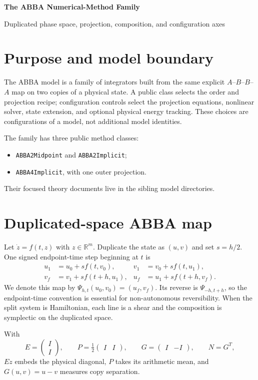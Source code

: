 \documentclass[11pt,a4paper]{article}
\newcommand{\R}{\mathbb{R}}
\begin{document}
\begin{center}
 {\LARGE\bfseries\color{gcblue}The ABBA Numerical-Method Family}\par
 \vspace{0.35em}
 {\large Duplicated phase space, projection, composition, and configuration axes}
\end{center}

\section{Purpose and model boundary}

The ABBA model is a family of integrators built from the same explicit
$A$--$B$--$B$--$A$ map on two copies of a physical state. A public class
selects the order and projection recipe;
configuration controls select the
projection equations, nonlinear solver, state extension, and optional physical
energy tracking.  These choices are configurations of a model, not additional
model identities.

The family has three public method classes:
\begin{itemize}
\item \texttt{ABBA2Midpoint} and \texttt{ABBA2Implicit};
\item \texttt{ABBA4Implicit}, with one outer projection.
\end{itemize}
Their focused theory documents live in the sibling model directories.

\section{Duplicated-space ABBA map}

Let $\dot z=f(t,z)$ with $z\in\R^m$.  Duplicate the state as $(u,v)$ and set
$s=h/2$.  One signed endpoint-time step beginning at $t$ is
\begin{align}
 u_1 &= u_0+s f(t,v_0), &
 v_1 &= v_0+s f(t,u_1),\\
 v_f &= v_1+s f(t+h,u_1), &
 u_f &= u_1+s f(t+h,v_f).
\end{align}
We denote this map by $\Psi_{h,t}(u_0,v_0)=(u_f,v_f)$.  Its reverse is
$\Psi_{-h,t+h}$, so the endpoint-time convention is essential for
non-autonomous reversibility.  When the split system is Hamiltonian, each
line is a shear and the composition is symplectic on the duplicated space.

With
\[
 E=\begin{pmatrix}I\\I\end{pmatrix},\qquad
 P=\tfrac12\begin{pmatrix}I&I\end{pmatrix},\qquad
 G=\begin{pmatrix}I&-I\end{pmatrix},\qquad N=G^T,
\]
$Ez$ embeds the physical diagonal, $P$ takes its arithmetic mean, and
$G(u,v)=u-v$ measures copy separation.
\end{document}
